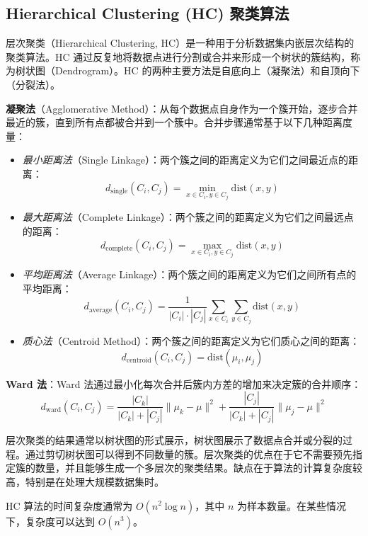 \documentclass{ctexart} %
\begin{document}
\subsection{Hierarchical Clustering (HC) 聚类算法}

层次聚类（Hierarchical Clustering, HC）是一种用于分析数据集内嵌层次结构的聚类算法。HC 通过反复地将数据点进行分割或合并来形成一个树状的簇结构，称为树状图（Dendrogram）。HC 的两种主要方法是自底向上（凝聚法）和自顶向下（分裂法）。

\textbf{凝聚法}（Agglomerative Method）：从每个数据点自身作为一个簇开始，逐步合并最近的簇，直到所有点都被合并到一个簇中。合并步骤通常基于以下几种距离度量：

\begin{itemize}
    \item \textit{最小距离法}（Single Linkage）：两个簇之间的距离定义为它们之间最近点的距离：
    \[
    d_{\text{single}}(C_i, C_j) = \min_{x \in C_i, y \in C_j} \text{dist}(x, y)
    \]
    \item \textit{最大距离法}（Complete Linkage）：两个簇之间的距离定义为它们之间最远点的距离：
    \[
    d_{\text{complete}}(C_i, C_j) = \max_{x \in C_i, y \in C_j} \text{dist}(x, y)
    \]
    \item \textit{平均距离法}（Average Linkage）：两个簇之间的距离定义为它们之间所有点的平均距离：
    \[
    d_{\text{average}}(C_i, C_j) = \frac{1}{|C_i| \cdot |C_j|} \sum_{x \in C_i} \sum_{y \in C_j} \text{dist}(x, y)
    \]
    \item \textit{质心法}（Centroid Method）：两个簇之间的距离定义为它们质心之间的距离：
    \[
    d_{\text{centroid}}(C_i, C_j) = \text{dist}(\mu_i, \mu_j)
    \]
\end{itemize}

\textbf{Ward 法}：Ward 法通过最小化每次合并后簇内方差的增加来决定簇的合并顺序：
\[
d_{\text{ward}}(C_i, C_j) = \frac{|C_k|}{|C_k| + |C_j|} \|\mu_k - \mu\|^2 + \frac{|C_j|}{|C_k| + |C_j|} \|\mu_j - \mu\|^2
\]

层次聚类的结果通常以树状图的形式展示，树状图展示了数据点合并或分裂的过程。通过剪切树状图可以得到不同数量的簇。层次聚类的优点在于它不需要预先指定簇的数量，并且能够生成一个多层次的聚类结果。缺点在于算法的计算复杂度较高，特别是在处理大规模数据集时。

HC 算法的时间复杂度通常为 \(O(n^2 \log n)\)，其中 \(n\) 为样本数量。在某些情况下，复杂度可以达到 \(O(n^3)\)。
\end{document}
